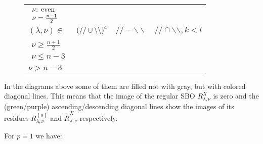 \documentclass[12pt]{article} %
\theoremstyle{definition}
\theoremstyle{exampstyle} \newtheorem{examp}[theorem]{Theorem}
\newcommand{\teven}{\mbox{\textrm{: even}}}
\begin{document}
\begin{enumerate}[(1)]
\begin{figure}[H]
\begin{tabular}{@{}m{1.6cm}@{}ccc}
	      \vspace{-3cm}$
	      \begin{array}{l}
		      \nu\teven\\\nu=\frac{n-1}{2}
	      \end{array}
	      $&\\[0pt]
	      $(\lambda,\nu)\in$&$\left(//\cup\backslash\backslash\right)^c$ & $//-\backslash\backslash$  & $//\cap\backslash\backslash,k< l$\\[0pt]
	      \vspace{-3cm}
	      $
	      \begin{array}{l}
		      \nu\ge\frac{n+1}{2}\\\nu\le n-3
	      \end{array}
	      $
	      &\\[0pt]
	      \vspace{-3cm}$
	      \nu>n-3$&\\[0pt]
	    \end{tabular}
	  \end{figure}
	\end{enumerate}
	\vspace{-0.9cm}
	In the diagrams above some of them are filled not with gray, but with colored diagonal lines. This means that the image of the regular
	SBO $R_{\lambda,\nu}^X$ is zero and the (green/purple)
	ascending/descending diagonal lines show the images of its residues $R_{\lambda,\nu}^{ \left\{ o \right\}}$ and $\tilde{R}_{\lambda,\nu}^X$ respectively.

	For $p=1$ we have:\\
	\newcommand{\mystack}[2]{$\begin{array}{l}#1\\#2\end{array}$}
\end{document}
